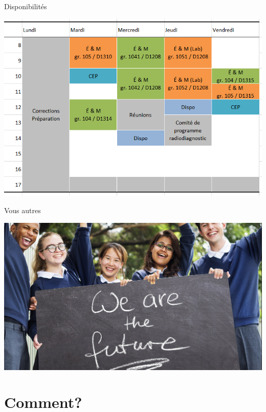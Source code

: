 \documentclass[12pt]{beamer}
\begin{document}
\begin{frame}{Disponibilités}
\begin{center}
\includegraphics[scale=0.5]{images/disponibilites.png}
\end{center}
\end{frame}


\begin{frame}{Vous autres}

\includegraphics[width=\textwidth]{images/students.jpg}

\end{frame}





\section{Comment?}
\end{document}
